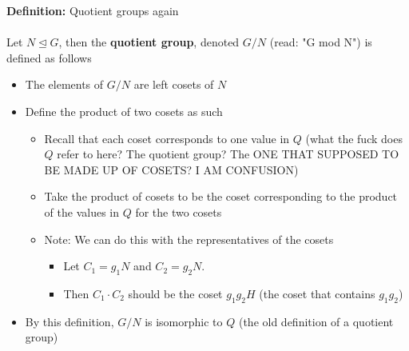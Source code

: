 \documentclass{article}
\begin{document}
\begin{definition} 
\textbf{Definition:} Quotient groups again \\
~\\
Let $N\trianglelefteq G$, then the {\color{blue} \textbf{quotient group}}, denoted $G /N$ (read: "G mod N") is defined as follows
\begin{itemize}
	\item The elements of $G /N$ are left cosets of $N$
	\item Define the product of two cosets as such
	\begin{itemize}
		\item Recall that each coset corresponds to one value in $Q$ (what the fuck does $Q$ refer to here? The quotient group? The ONE THAT SUPPOSED TO BE MADE UP OF COSETS? I AM CONFUSION)
		\item Take the product of cosets to be the coset corresponding to the product of the values in $Q$ for the two cosets
		\item Note: We can do this with the representatives of the cosets
		\begin{itemize}
			\item Let $C_1 = g_1N$ and $C_2 = g_2N$. 
			\item Then $C_1 \cdot C_2$ should be the coset $g_1g_2H$ (the coset that contains $g_1g_2$)
		\end{itemize}
	\end{itemize}
\item By this definition, $G/ N$ is isomorphic to $Q$ (the old definition of a quotient group)
\end{itemize}
\end{definition}
\end{document}
